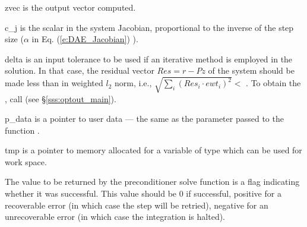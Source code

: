 {{\begin{args}[p\_data]
  \item[zvec]
    is the output vector computed.
  \item[c\_j]
    is the scalar in the system Jacobian, proportional to the inverse of the
    step size ($\alpha$ in Eq. (\ref{e:DAE_Jacobian}) ).
  \item[delta]
    is an input tolerance to be used if an iterative method 
    is employed in the solution.  In that case, the residual 
    vector $Res = r - P z$ of the system should be made less than 
     in weighted $l_2$ norm,     
    i.e., $\sqrt{\sum_i (Res_i \cdot ewt_i)^2 } <$ .
    To obtain the  , call  
    (see \S\ref{sss:optout_main}).
  \item[p\_data]
    is a pointer to user data --- the same as the       
    parameter passed to the function .
  \item[tmp]
    is a pointer to memory allocated for a variable of type    
     which can be used for work space.
  \end{args}
}
{
  The value to be returned by the preconditioner solve function is a flag
  indicating whether it was successful.  This value should be $0$ if successful, 
  positive for a recoverable error (in which case the step will be retried),     
  negative for an unrecoverable error (in which case the integration is halted). 
}
{}
}
